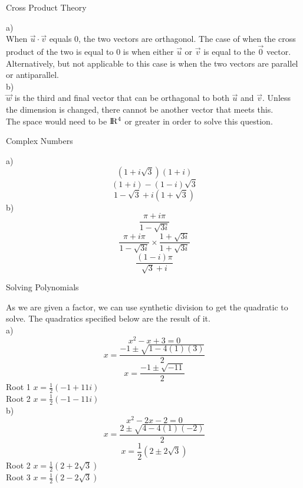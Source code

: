 \documentclass[12pt]{article}
\newenvironment{problem}[2][Problem]{\begin{trivlist}
\item[\hskip \labelsep {\bfseries #1}\hskip \labelsep {\bfseries #2.}]}{\end{trivlist}}
\begin{document}
	
	
\begin{problem}{8}
	Cross Product Theory
\end{problem}
a)\\
	When $\vec u \cdot \vec v$ equals 0, the two vectors are orthagonol.
	The case of when the cross product of the two is equal to 0 is when either $\vec u $ or $ \vec v$
	is equal to the $ \vec 0 $ vector.
	Alternatively, but not applicable to this case is when the two vectors are parallel or antiparallel.\\
b)\\
	$\vec w$ is the third and final vector that can be orthagonal to both $\vec u $ and $\vec v$. Unless the dimension is changed, there cannot be another vector that meets this.\\
	The space would need to be $\rm I\!R^4$ or greater in order to solve this question.
\begin{problem}{9}
	Complex Numbers
\end{problem}
a)\\
	\[(1+ i\sqrt{3})(1 + i)\]
	\[(1+i)-(1-i)\sqrt{3}\]
	\[1 - \sqrt{3} + i(1 + \sqrt{3})\]
b)\\
	\[\frac{\pi + i\pi}{1 - \sqrt{3i}}\]
	\[\frac{\pi + i\pi}{1 - \sqrt{3i}} \times \frac{1 + \sqrt{3i}}{1 + \sqrt{3i}} \]
	\[\frac{(1 -i) \pi}{\sqrt{3} + i}\]

\begin{problem}{10}
	Solving Polynomials
\end{problem}
	As we are given a factor, we can use synthetic division to get the quadratic to solve.
	The quadratics specified below are the result of it.\\
a)\\
	\[x^2 -x + 3 = 0\]
	\[x = \frac{-1 \pm \sqrt{1 - 4(1)(3)}}{2}\]
	\[x = \frac{-1 \pm \sqrt{-11}}{2}\]
	Root 1 $x = \frac{1}{2} (-1 + 11i)$\\
	Root 2 $x = \frac{1}{2} (-1 - 11i)$\\
b)\\
	\[x^2 -2x -2 = 0\]
	\[x = \frac{2 \pm \sqrt{4 - 4(1)(-2)}}{2}\]
	\[x = \frac{1}{2} (2 \pm 2\sqrt{3})\]
	Root 2 $x = \frac{1}{2} (2 + 2\sqrt{3})$\\
	Root 3 $x = \frac{1}{2} (2 - 2\sqrt{3})$\\
	
\end{document}
